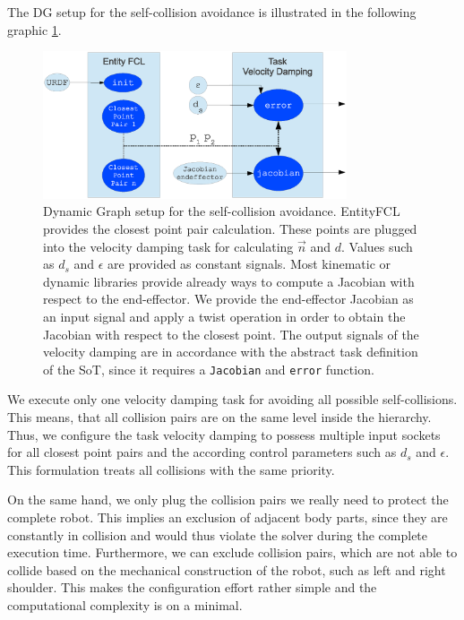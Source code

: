 The DG setup for the self-collision avoidance is illustrated in the following graphic \ref{fig:capsuledistance}.
\begin{figure}[h!]
  \centering
    \includegraphics[width=0.8\textwidth]{../figures/dg_collision.eps}
    \caption{Dynamic Graph setup for the self-collision avoidance. EntityFCL provides the closest point pair calculation. These points are plugged into the velocity damping task for calculating $\vec{n}$ and $d$. Values such as $d_s$ and $\epsilon$ are provided as constant signals. Most kinematic or dynamic libraries provide already ways to compute a Jacobian with respect to the end-effector. We provide the end-effector Jacobian as an input signal and apply a twist operation in order to obtain the Jacobian with respect to the closest point. The output signals of the velocity damping are in accordance with the abstract task definition of the SoT, since it requires a \texttt{Jacobian} and \texttt{error} function.}
    \label{fig:capsuledistance}
\end{figure}

We execute only one velocity damping task for avoiding all possible self-collisions. This means, that all collision pairs are on the same level inside the hierarchy. Thus, we configure the task velocity damping to possess multiple input sockets for all closest point pairs and the according control parameters such as $d_s$ and $\epsilon$. This formulation treats all collisions with the same priority.

On the same hand, we only plug the collision pairs we really need to protect the complete robot. This implies an exclusion of adjacent body parts, since they are constantly in collision and would thus violate the solver during the complete execution time. Furthermore, we can exclude collision pairs, which are not able to collide based on the mechanical construction of the robot, such as left and right shoulder. This makes the configuration effort rather simple and the computational complexity is on a minimal.

